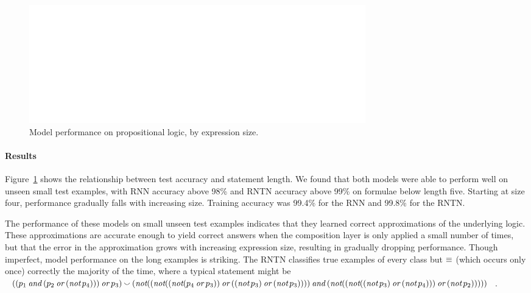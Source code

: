 \begin{figure}[t]
  \centering
  \includegraphics[width=5.75in]{decayfig.eps}
  \caption{Model performance on propositional logic, by expression size.}
    
  \label{prop-results} 
  
\end{figure}


\paragraph{Results} Figure~\ref{prop-results} shows the relationship
between test accuracy and statement length. We found that both 
models were able to perform well on unseen small test examples, 
with RNN accuracy above
98\% and RNTN accuracy above 99\% on formulae below length five.
Starting at size four, performance gradually falls with increasing
size. Training accuracy was 99.4\% for the RNN and 99.8\% for the RNTN.

The performance of these models on small unseen test examples
indicates that they learned correct approximations of the underlying
logic. These approximations are accurate enough to yield
correct answers when the composition layer is only applied a small
number of times, but that the error in the approximation grows with
increasing expression size, resulting in gradually dropping performance. 
Though imperfect, model performance on the long examples is striking. 
The RNTN classifies true examples of every class but $\equiv$ 
(which occurs only once) correctly the majority of the time, where a 
typical statement might be $( ( p_1  \mathbin{\textit{and}} ( p_2 \mathbin{\textit{or}} ( \mathop{\textit{not}} p_4 ) ) ) \mathbin{\textit{or}} p_3 ) \mathbin{\smallsmile} ( \mathop{\textit{not}} ( ( \mathop{\textit{not}} ( ( \mathop{\textit{not}} ( p_4 \mathbin{\textit{or}} p_3 ) )  \mathbin{\textit{or}} ( ( \mathop{\textit{not}} p_3 ) \mathbin{\textit{or}} ( \mathop{\textit{not}} p_3 ) ) ) ) \mathbin{\textit{and}} ( \mathop{\textit{not}} ( ( \mathop{\textit{not}} ( ( \mathop{\textit{not}} p_3 ) \mathbin{\textit{or}} ( \mathop{\textit{not}} p_4 ) ) ) \mathbin{\textit{or}} ( \mathop{\textit{not}} p_2 ) ) ) ) )$.

